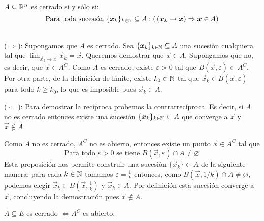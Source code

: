 \begin{proposicion} $A\subseteq \mathbb{R}^n$ es cerrado si y s\'olo si:
$$
\text{Para toda sucesi\'on } \{\boldsymbol{x}_k\}_{k\in\mathbb{N}}\subseteq A : 
(\thinspace (\boldsymbol{x}_k\to \boldsymbol{x}) \Rightarrow \boldsymbol{x}\in A)
$$
\end{proposicion}

\begin{demostracion}
\textcolor{white}{linea en blanco}
\\($\Rightarrow$): Supongamos que $A$ es cerrado. Sea  
$\{\boldsymbol{x}_k\}_{k\in\mathbb{N}}\subseteq A$ una sucesi\'on cualquiera tal que
$ \lim_{\vec{x}_k\to \vec{x}}\vec{x}_k=\vec{x}$. Queremos demostrar que $\vec{x}\in A$.
Supongamos que no, es decir, que $\vec{x}\in A^C$. Como $A$ es cerrado, existe
$\varepsilon>0$ tal que  $B(\vec{x},\varepsilon)\subset A^C$. 
Por otra parte, de la definici\'on de l\'imite, 
existe $k_0\in\mathbb{N}$ tal que $\vec{x}_k\in B(\vec{x},\varepsilon)$ para todo $k\ge k_0$, lo que
es imposible pues $\vec{x}_k\in A$.

\smallskip

($\Leftarrow$): Para demostrar la rec\'iproca probemos la contrarrec\'iproca.
Es decir, si $A$ no es cerrado entonces existe una sucesi\'on $\{\boldsymbol{x}_k\}_{k\in\mathbb{N}}
\subset A$
que converge a $\vec{x}$ y $\vec{x}\not \in A$.

Como $A$ no es cerrado, $A^C$ no es abierto, entonces existe un punto 
$\vec{x}\in A^C$ tal que
$$
\text{Para todo }\varepsilon>0 \text{ se tiene } B(\vec{x},\varepsilon)\cap A\not =\varnothing
$$
Esta proposici\'on nos permite construir una sucesi\'on $\{\vec{x}_k\}\subset A$
de la siguiente manera: para cada $k\in \mathbb{N}$  
tomamos $\varepsilon=\frac{1}{k}$ entonces, como $ B(\vec{x},1/k )\cap A\not 
=\varnothing$, podemos elegir $\vec{x}_k\in B(\vec{x},\frac{1}{k})$ y $\vec{x}_k\in A$. Por 
definici\'on esta sucesi\'on converge a $\vec{x}$, concluyendo la demostraci\'on pues 
$\vec{x}\not \in A$.
\end{demostracion}

\begin{teorema} 
$A\subseteq E$ es cerrado $\Leftrightarrow A^C$ es abierto.
\end{teorema}

